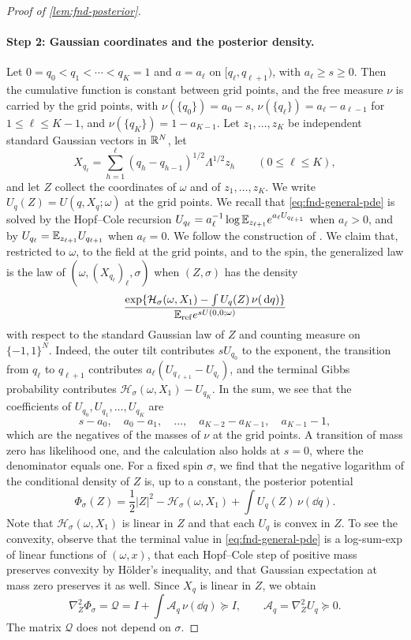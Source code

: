 \begin{proof}[Proof of \cref{lem:fnd-posterior}]
\paragraph{Step 2: Gaussian coordinates and the posterior density.}
Let $0=q_0<q_1<\cdots<q_K=1$ and $a=a_\ell$ on $[q_\ell,q_{\ell+1})$,
with $a_\ell\ge s\ge0$. Then the cumulative function is constant between
grid points,
and the free measure $\nu$ is carried by the grid points, with
$\nu(\{q_0\})=a_0-s$, $\nu(\{q_\ell\})=a_\ell-a_{\ell-1}$ for
$1\le\ell\le K-1$, and $\nu(\{q_K\})=1-a_{K-1}$. Let
$z_1,\ldots,z_K$ be independent standard Gaussian vectors in $\mathbb R^N$, let
\[
 X_{q_\ell}=\sum_{h=1}^\ell(q_h-q_{h-1})^{1/2}\Lambda^{1/2}z_h
 \qquad(0\le\ell\le K),
\]
and let $Z$ collect the coordinates of $\omega$ and of
$z_1,\ldots,z_K$. We write $U_q(Z)=U(q,X_q;\omega)$ at the grid points.
We recall that \eqref{eq:fnd-general-pde} is solved by the Hopf--Cole
recursion
$U_{q_\ell}=a_\ell^{-1}\log\mathbb E_{z_{\ell+1}}e^{a_\ell U_{q_{\ell+1}}}$ when
$a_\ell>0$, and by $U_{q_\ell}=\mathbb E_{z_{\ell+1}}U_{q_{\ell+1}}$ when
$a_\ell=0$. We follow the construction of \cite[(2.1)--(2.3)]{AL}. We claim
that, restricted to $\omega$, to the field at the grid points, and to the
spin, the generalized law is the law of
$(\omega,(X_{q_\ell})_\ell,\sigma)$ when $(Z,\sigma)$ has the density
\[
 \frac{\exp\{\mathcal H_\sigma(\omega,X_1)
                    -\int U_q(Z)\,\nu(\,\mathrm d q)\}}
      {\mathbb E_{\rm ref}e^{sU(0,0;\omega)}}
\]
with respect to the standard Gaussian law of $Z$ and counting measure on
$\{-1,1\}^N$. Indeed, the outer tilt contributes
$sU_{q_0}$ to the exponent, the transition from $q_\ell$ to
$q_{\ell+1}$ contributes $a_\ell(U_{q_{\ell+1}}-U_{q_\ell})$, and the
terminal Gibbs probability contributes $\mathcal H_\sigma(\omega,X_1)-U_{q_K}$.
In the sum, we see that the coefficients of
$U_{q_0},U_{q_1},\ldots,U_{q_K}$ are
\[
 s-a_0,\quad a_0-a_1,\quad\ldots,\quad a_{K-2}-a_{K-1},\quad a_{K-1}-1,
\]
which are the negatives of the masses of $\nu$ at the grid points.
A transition of mass zero has likelihood one, and the calculation also
holds at $s=0$, where the denominator equals one. For a fixed spin
$\sigma$, we find that the negative logarithm of the conditional density
of $Z$ is, up to a constant, the posterior potential
\[
 \Phi_\sigma(Z)=\frac12|Z|^2-\mathcal H_\sigma(\omega,X_1)
           +\int U_q(Z)\,\nu(\dd q).
\]
Note that $\mathcal H_\sigma(\omega,X_1)$ is linear in $Z$ and that each
$U_q$ is convex in $Z$. To see the convexity, observe that the terminal value
in \eqref{eq:fnd-general-pde} is a log-sum-exp of linear functions of
$(\omega,x)$, that each Hopf--Cole step of positive mass preserves
convexity by H\"older's inequality, and that Gaussian expectation at
mass zero preserves it as well. Since $X_q$ is linear in $Z$,
we obtain
\[
 \nabla_Z^2\Phi_\sigma=\mathcal Q=I+\int\mathcal A_q\,\nu(\dd q)\succeq I,
 \qquad
 \mathcal A_q=\nabla_Z^2U_q\succeq0 .
\]
The matrix $\mathcal Q$ does not depend on $\sigma$.


\end{proof}
